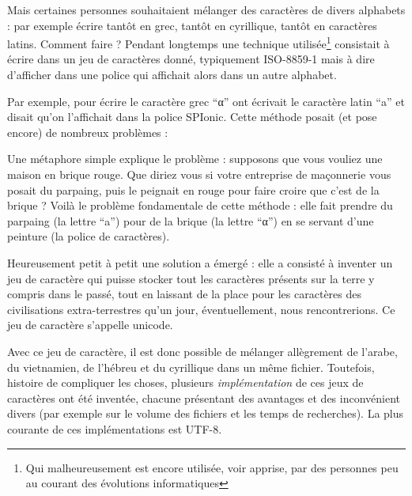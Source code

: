 Mais certaines personnes souhaitaient mélanger des caractères de divers alphabets : par exemple écrire tantôt en grec, tantôt en cyrillique, tantôt en caractères latins. Comment faire ? Pendant longtemps une technique utilisée\footnote{Qui malheureusement est encore utilisée, voir apprise, par des personnes peu au courant des évolutions informatiques} consistait à écrire dans un jeu de caractères donné, typiquement ISO-8859-1 mais à dire d'afficher dans une police qui affichait alors dans un autre alphabet. 

Par exemple, pour écrire le caractère grec \enquote{α} ont écrivait le caractère latin \enquote{a} et disait qu'on l'affichait dans la police SPIonic. Cette méthode posait (et pose encore) de nombreux problèmes :

Une métaphore simple explique le problème : supposons que vous vouliez une maison en brique rouge. Que diriez vous si votre entreprise de maçonnerie vous posait du parpaing, puis le peignait en rouge pour faire croire que c'est de la brique ? Voilà le problème fondamentale de cette méthode : elle fait prendre du parpaing (la lettre \enquote{a}) pour de la brique (la lettre \enquote{α}) en se servant d'une peinture (la police de caractères).

Heureusement petit à petit une solution a émergé : elle a consisté à inventer un jeu de caractère qui puisse stocker tout les caractères présents sur la terre y compris dans le passé, tout en laissant de la place pour les caractères des civilisations extra-terrestres qu'un jour, éventuellement, nous rencontrerions. Ce jeu de caractère s'appelle unicode.

Avec ce jeu de caractère, il est donc possible de mélanger allègrement de l'arabe, du vietnamien, de l'hébreu et du cyrillique dans un même fichier. Toutefois, histoire de compliquer les choses, plusieurs \emph{implémentation} de ces jeux de caractères ont été inventée, chacune présentant des avantages et des inconvénient divers (par exemple sur le volume des fichiers et les temps de recherches). La plus courante de ces implémentations est UTF-8.

